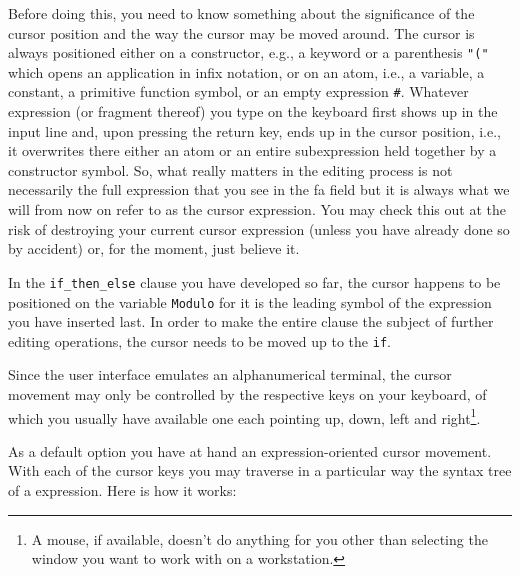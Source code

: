 Before doing this, you need to know something about the significance
of the {\mys cursor position} and the way the cursor may be {\mys moved} around.
The cursor is always positioned either on a \kir constructor, e.g., a
keyword or a parenthesis {\tt "("} which opens an application in infix notation,
 or on an {\mys atom}, i.e., a {\mys variable}, a {\mys constant}, a {\mys primitive function} symbol,
or an empty expression {\tt \#}.
Whatever expression (or fragment thereof) you type on the keyboard first 
shows up in the input line and, upon pressing the return key,
 ends up in the cursor position, i.e.,
it overwrites there either an atom or an entire subexpression held together
by a constructor symbol. So, what really matters in the editing process
is not necessarily the full expression that you see in the 
{\sc fa} field but it is always what we will from now on refer to as the
{\mys cursor expression}. You may check this out at the risk of destroying
your current cursor expression (unless you have already done so by accident)
or, for the moment, just believe it.

In the {\tt if\_then\_else} clause you have developed so far, the cursor
happens to be positioned on the variable {\tt Modulo} for it is the
 leading symbol
of the expression you have inserted last. In order to make the entire clause the subject of further editing operations, the cursor needs to be moved up
to the {\tt if}.

Since the \pired user interface emulates an alphanumerical terminal, the
{\mys cursor movement} may only be controlled by the respective keys on your 
keyboard, of which you usually have available one each pointing {\mys up}, {\mys down},
{\mys left} and {\mys right}\footnote{A mouse, if available, doesn't do anything for you other than selecting
the window you want to work with on a workstation.}.

 As a default option you have at hand an expression-oriented cursor movement.
 With each of the cursor keys you may traverse in  a particular way
the {\mys syntax tree} of a \kir expression.
Here is how it works:

